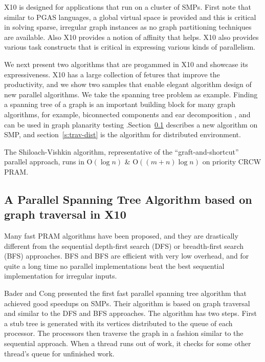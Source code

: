 \documentclass{llncs}
\newcommand{\paren}[1]{\left(  #1 \right)}
\newcommand{\bigO}[1]{\mbox{\mbox{O}$\paren{#1}$}\xspace}
\begin{document}
 X10 is designed for applications that run on a cluster of SMPs. First note that similar to PGAS languages, a global virtual space is provided and this is critical in solving sparse, irregular graph instances as no graph partitioning techniques are available. Also X10 provides a notion of affinity that helps. X10 also provides various task constructs that is critical in expressing various kinds of parallelism. 

 We next present two algorithms that are progammed in X10 and showcase its expressiveness. X10 has a large collection of fetures that improve the productivity, and we show two samples that enable elegant algorithm design of new parallel algorithms. We take the spanning tree problem as example. Finding a spanning tree of a graph is an important building
block for many graph algorithms, for example, biconnected components
and ear decomposition \cite{MR86}, and can be used in graph planarity
testing \cite{KR88}.Section~\ref{s:trav} describes a new algorithm on SMP, and section~\ref{s:trav-dist} is the algorithm
for distributed environment.


 
The Shiloach-Vishkin algorithm, representative of the ``graft-and-shortcut'' parallel approach,
 runs in \bigO{\log n} & \bigO{(m+n) \log n} on priority CRCW PRAM.

\subsection{A Parallel Spanning Tree Algorithm based on graph traversal in X10}
\label{s:trav}

Many fast PRAM algorithms have been proposed, and they 
are drastically different from the sequential depth-first search (DFS) or breadth-first search (BFS) approaches.
BFS and BFS are efficient with very low overhead, and for quite a long time no parallel implementations beat the
best sequential implementation for irregular inputs. 

Bader and Cong \cite{BC04} presented the first fast parallel spanning tree algorithm that achieved good 
speedups on SMPs. Their algorithm is based on graph traversal and similar to the DFS and BFS approaches. 
The algorithm has two steps. First a stub tree is generated with its vertices distributed to the queue of each 
processor. The processors then traverse the graph in a fashion similar to the sequential approach. When a thread runs out
of work, it checks for some other thread's queue for unfinished work.
\end{document}
